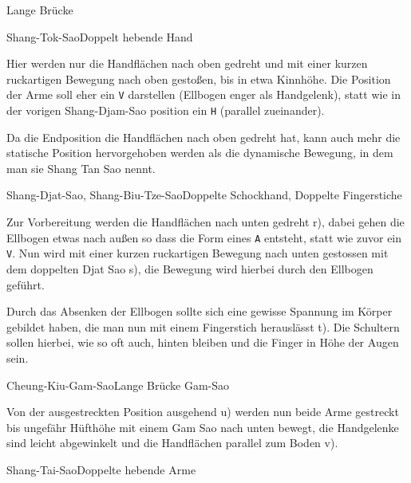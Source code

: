 \begin{WTSatz}{Lange Br\"ucke}
	\def\WTFormenSNTLetter#1{\texttt{#1}}
	
	\begin{WTSatzTeil}{Shang-Tok-Sao}{Doppelt hebende Hand}
		
		Hier werden nur die Handfl\"achen nach oben gedreht und mit einer kurzen ruckartigen Bewegung nach oben gesto{\ss}en, bis in etwa Kinnh\"ohe. Die Position der Arme soll eher ein \WTFormenSNTLetter{V} darstellen (Ellbogen enger als Handgelenk), statt wie in der vorigen Shang-Djam-Sao position ein \WTFormenSNTLetter{H} (parallel zueinander).
		
		Da die Endposition die Handfl\"achen nach oben gedreht hat, kann auch mehr die statische Position hervorgehoben werden als die dynamische Bewegung, in dem man sie Shang Tan Sao nennt.
		
	\end{WTSatzTeil}
	\begin{WTSatzTeil}{Shang-Djat-Sao, Shang-Biu-Tze-Sao}{Doppelte Schockhand, Doppelte Fingerstiche}
		
		Zur Vorbereitung werden die Handfl\"achen nach unten gedreht r), dabei gehen die Ellbogen etwas nach au{\ss}en so dass die Form eines \WTFormenSNTLetter{A} entsteht, statt wie zuvor ein \WTFormenSNTLetter{V}. Nun wird mit einer kurzen ruckartigen Bewegung nach unten gestossen mit dem doppelten Djat Sao s), die Bewegung wird hierbei durch den Ellbogen gef\"uhrt.
		
		Durch das Absenken der Ellbogen sollte sich eine gewisse Spannung im K\"orper gebildet haben, die man nun mit einem Fingerstich herausl\"asst t). Die Schultern sollen hierbei, wie so oft auch, hinten bleiben und die Finger in H\"ohe der Augen sein.
		
	\end{WTSatzTeil}
	\begin{WTSatzTeil}{Cheung-Kiu-Gam-Sao}{Lange Br\"ucke Gam-Sao}
		
		Von der ausgestreckten Position ausgehend u) werden nun beide Arme gestreckt bis ungef\"ahr H\"ufth\"ohe mit einem Gam Sao nach unten bewegt, die Handgelenke sind leicht abgewinkelt und die Handfl\"achen parallel zum Boden v).
		
	\end{WTSatzTeil}
	\begin{WTSatzTeil}{Shang-Tai-Sao}{Doppelte hebende Arme}
		

\end{WTSatzTeil}
\end{WTSatz}
